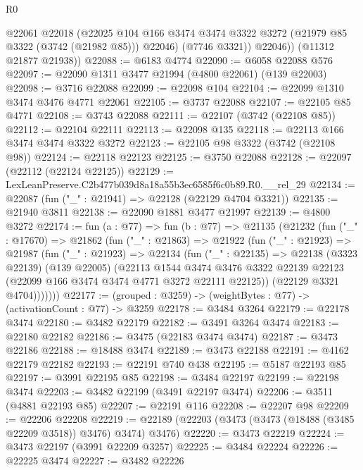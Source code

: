 \begin{lexlean}{R0}
\begin{coremodule}
            @22061
            @22018
            (@22025
              @104
              @166
              @3474
              @3474
              @3322
              @3272
              (@21979 @85 @3322 (@3742 (@21982 @85)))
              @22046)
            (@7746 @3321))
          @22046))
      (@11312 @21877 @21938))
@22088 := @6183 @4774
@22090 := @6058 @22088 @576
@22097 := @22090 @1311 @3477 @21994 (@4800 @22061) (@139 @22003)
@22098 := @3716 @22088
@22099 := @22098 @104
@22104 := @22099 @1310 @3474 @3476 @4771 @22061
@22105 := @3737 @22088
@22107 := @22105 @85 @4771
@22108 := @3743 @22088
@22111 := @22107 (@3742 (@22108 @85))
@22112 := @22104 @22111
@22113 := @22098 @135
@22118 := @22113 @166 @3474 @3474 @3322 @3272
@22123 := @22105 @98 @3322 (@3742 (@22108 @98))
@22124 := @22118 @22123
@22125 := @3750 @22088
@22128 := @22097 (@22112 (@22124 @22125))
@22129 := LexLeanPreserve.C2b477b039d8a18a55b3ec6585f6c0b89.R0.__rel_29
@22134 := @22087 (fun ("_" : @21941) => @22128 (@22129 @4704 @3321))
@22135 := @21940 @3811
@22138 := @22090 @1881 @3477 @21997
@22139 := @4800 @3272
@22174 := fun (a : @77) =>
  fun (b : @77) =>
  @21135
    (@21232
      (fun ("_" : @17670) =>
      @21862
        (fun ("_" : @21863) =>
        @21922
          (fun ("_" : @21923) =>
          @21987
            (fun ("_" : @21923) =>
            @22134
              (fun ("_" : @22135) =>
              @22138
                (@3323 @22139)
                (@139 @22005)
                (@22113
                  @1544
                  @3474
                  @3476
                  @3322
                  @22139
                  @22123
                  (@22099 @166 @3474 @3474 @4771 @3272 @22111 @22125))
                (@22129 @3321 @4704)))))))
@22177 := (grouped : @3259) -> (weightBytes : @77) -> (activationCount : @77) -> @3259
@22178 := @3484 @3264
@22179 := @22178 @3474
@22180 := @3482 @22179
@22182 := @3491 @3264 @3474
@22183 := @22180 @22182
@22186 := @3475 (@22183 @3474 @3474)
@22187 := @3473 @22186
@22188 := @18488 @3474
@22189 := @3473 @22188
@22191 := @4162 @22179 @22182
@22193 := @22191 @740 @438
@22195 := @5187 @22193 @85
@22197 := @3991 @22195 @85
@22198 := @3484 @22197
@22199 := @22198 @3474
@22203 := @3482 @22199 (@3491 @22197 @3474)
@22206 := @3511 (@4881 @22193 @85)
@22207 := @22191 @116
@22208 := @22207 @98
@22209 := @22206 @22208
@22219 := @22189 (@22203 (@3473 (@3473 (@18488 (@3485 @22209 @3518)) @3476) @3474) @3476)
@22220 := @3473 @22219
@22224 := @3473 @22197 (@3991 @22209 @3257)
@22225 := @3484 @22224
@22226 := @22225 @3474
@22227 := @3482 @22226

\end{coremodule}
\end{lexlean}
